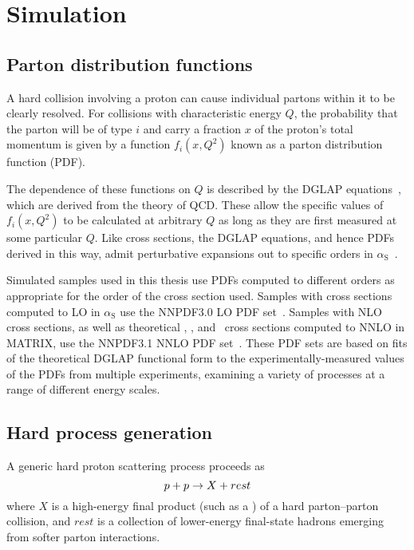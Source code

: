 \chapter{Simulation} \label{chap:simulation}
\section{Parton distribution functions} \label{sec:simulation_pdf}
A hard collision involving a proton can cause individual partons within it to be clearly resolved.
For collisions with characteristic energy $Q$, the probability that the parton will be of type $i$
and carry a fraction $x$ of the proton's total momentum is given by a function $f_{i}(x, Q^{2})$
known as a parton distribution function (PDF).

The dependence of these functions on $Q$ is described by the DGLAP equations~\cite{ref:0370-2693(71)90576-4, ref:dokshitzer, ref:0550-3213(77)90384-4},
which are derived from the theory of QCD.
These allow the specific values of $f_{i}(x, Q^{2})$ to be calculated at arbitrary $Q$ as long as they
are first measured at some particular $Q$.
Like cross sections, the DGLAP equations, and hence PDFs derived in this way, admit perturbative expansions out to specific orders in
$\alpha_\mathrm{S}$~\cite{ref:0034-4885/70/1/R02}.

Simulated samples used in this thesis use PDFs computed to different orders as appropriate for the order
of the cross section used. Samples with cross sections computed to LO in $\alpha_\mathrm{S}$ use the NNPDF3.0 LO PDF
set~\cite{ref:NNPDF30}. Samples with NLO cross sections, as well as theoretical \zinvg, \wlng, and \zllg\ cross sections
computed to NNLO in MATRIX, use the NNPDF3.1 NNLO PDF set~\cite{ref:NNPDF31}.
These PDF sets are based on fits of the theoretical DGLAP functional form to the experimentally-measured values
of the PDFs from multiple experiments, examining a variety of processes at a range of different energy scales.

\section{Hard process generation} \label{sec:simulation_hard_process}
A generic hard proton scattering process proceeds as
\begin{equation}
p + p \to X + rest
\label{eq:proton_interaction}
\end{equation}
where $X$ is a high-energy final product (such as a \Pgamma) of a hard parton--parton collision, and $rest$ is a collection of
lower-energy final-state hadrons emerging from softer parton interactions.

